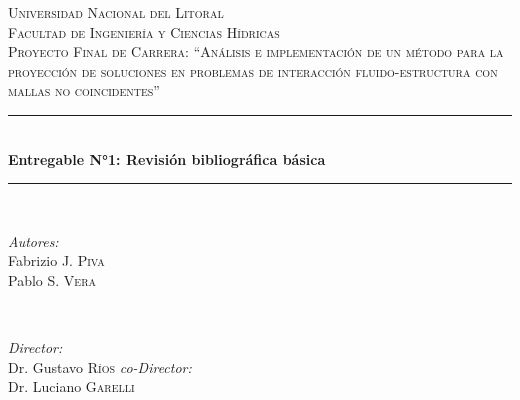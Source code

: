 \begin{titlepage}

  \newcommand{\HRule}{\rule{\linewidth}{0.5mm}} %

  \center %
 

  \textsc{\LARGE Universidad Nacional del
    Litoral}\\[1.5cm] %
  \textsc{\Large Facultad de Ingeniería y Ciencias Hídricas}\\[0.5cm] %
  \textsc{\large Proyecto Final de Carrera:
    ``Análisis e implementación de un método para la proyección de
    soluciones en problemas de interacción fluido-estructura con mallas no coincidentes''}\\[0.5cm] %


  \HRule \\[0.4cm]
  { \huge \bfseries Entregable N°1:
    Revisión bibliográfica básica}\\[0.4cm] %
  \HRule \\[1.0cm]
 

  \begin{minipage}{0.4\textwidth}
    \begin{flushleft} \large
      \emph{Autores:}\\
        Fabrizio J. \textsc{Piva} \\ %
        Pablo S. \textsc{Vera} \\ %
    \end{flushleft}
  \end{minipage}
  ~
  \begin{minipage}{0.4\textwidth}
    \begin{flushright} \large
      \emph{Director:} \\
      Dr. Gustavo \textsc{Ríos} %
      \emph{co-Director:} \\
      Dr. Luciano \textsc{Garelli} %
    \end{flushright}
  \end{minipage}\\[1cm]


\end{titlepage}
